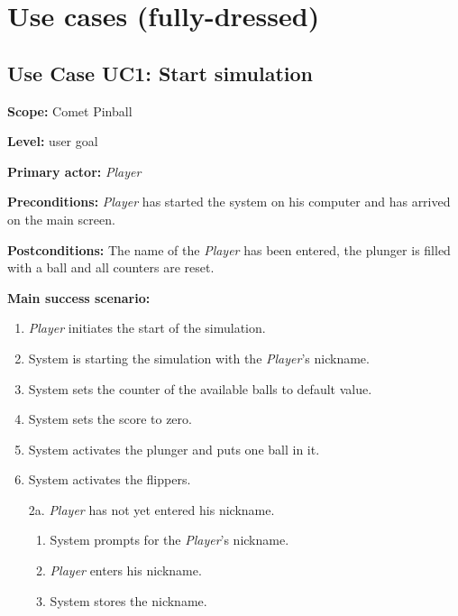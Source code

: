 \documentclass[fontsize=12pt,
               paper=a4,
               twoside=false,
               parskip=half,
               ]{scrartcl}
\begin{document}



\section{Use cases (fully-dressed)}

\subsection{Use Case UC1: Start simulation}

\textbf{\textsf{Scope:}} Comet Pinball

\textbf{\textsf{Level:}} user goal

\textbf{\textsf{Primary actor:}} \emph{Player}

\textbf{\textsf{Preconditions:}} \emph{Player} has started the system on his computer and has arrived on the main screen.

\textbf{\textsf{Postconditions:}} The name of the \emph{Player} has been entered, the plunger is filled with a ball and all counters are reset.

\textbf{\textsf{Main success scenario:}}

\begin{enumerate}[leftmargin=3em]
	\item \emph{Player} initiates the start of the simulation.
	\item System is starting the simulation with the \emph{Player}'s nickname.
	\item System sets the counter of the available balls to default value.
	\item System sets the score to zero.
	\item System activates the plunger and puts one ball in it. 
	\item System activates the flippers.
\end{enumerate}


\begin{itemize}[leftmargin=3em]
	\item[2a.] 	\emph{Player} has not yet entered his nickname.
	\begin{enumerate}
		\item System prompts for the \emph{Player}'s nickname.
		\item \emph{Player} enters his nickname.
		\item System stores the nickname.
	\end{enumerate}
\end{itemize}
\end{document}
